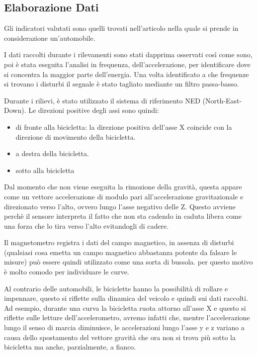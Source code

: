 \documentclass[class=article]{standalone}
\begin{document}
	
	
	\subsection{Elaborazione Dati}
	Gli indicatori valutati sono quelli trovati nell'articolo \cite{chen} nella quale si prende in considerazione un'automobile.
	
	I dati raccolti durante i rilevamenti sono stati dapprima osservati così come sono, poi è stata eseguita l'analisi in frequenza, dell'accelerazione, per identificare dove si concentra la maggior parte dell'energia.
	Una volta identificato a che frequenze si trovano i disturbi il segnale è stato tagliato mediante un filtro passa-basso.
	
	Durante i rilievi, è stato utilizzato il sistema di riferimento NED (North-East-Down). Le direzioni positive degli assi sono quindi:
	\begin{itemize}
		\item di fronte alla bicicletta: la direzione positiva dell'asse X coincide con la direzione di movimento della bicicletta.
		\item a destra della bicicletta.
		\item sotto alla bicicletta
	\end{itemize}
	
	Dal momento che non viene eseguita la rimozione della gravità, questa appare come un vettore accelerazione di modulo pari all'accelerazione gravitazionale e direzionato verso l'alto, ovvero lungo l'asse negativo delle Z. Questo avviene perchè il sensore interpreta il fatto che non sta cadendo in caduta libera come una forza che lo tira verso l'alto evitandogli di cadere.
	
	Il magnetometro registra i dati del campo magnetico, in assenza di disturbi (qualsiasi cosa emetta un campo magnetico abbastanza potente da falsare le misure) può essere quindi utilizzato come una sorta di bussola. per questo motivo è molto comodo per individuare le curve.
	
	Al contrario delle automobili, le biciclette hanno la possibilità di rollare e impennare, questo si riflette sulla dinamica del veicolo e quindi sui dati raccolti.
	Ad esempio, durante una curva la bicicletta ruota attorno all'asse X e questo si riflette sulle letture dell'accelerometro, avremo infatti che, mentre l'accelerazione lungo il senso di marcia diminuisce, le accelerazioni lungo l'asse y e z variano a causa dello spostamento del vettore gravità che ora non si trova più sotto la bicicletta ma anche, parzialmente, a fianco.
	
\end{document}
